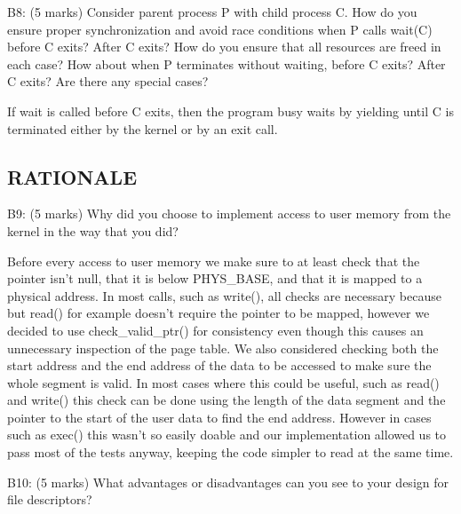 \noindent B8: (5 marks)
Consider parent process P with child process C.  How do you
ensure proper synchronization and avoid race conditions when P
calls wait(C) before C exits?  After C exits?  How do you ensure
that all resources are freed in each case?  How about when P
terminates without waiting, before C exits?  After C exits?  Are
there any special cases?


If wait is called before C exits, then the program busy waits by yielding until C is terminated either by the kernel or by an exit call.



\subsection*{RATIONALE}

\noindent B9: (5 marks)
Why did you choose to implement access to user memory from the
kernel in the way that you did?


Before every access to user memory we make sure to at least check that the pointer isn't null, that it is below PHYS\_BASE, and  that it is mapped to a physical address.
In most calls, such as write(), all checks are necessary because
but read() for example doesn't require the pointer to be mapped, however we decided to use check\_valid\_ptr() for consistency even though this causes an unnecessary inspection of the page table.
We also considered checking both the start address and the end address of the data to be accessed to make sure the whole segment is valid.
In most cases where this could be useful, such as read() and write() this check can be done using the length of the data segment and the pointer to the start of the user data to find the end address. However in cases such as exec() this wasn't so easily doable and our implementation allowed us to pass most of the tests anyway, keeping the code simpler to read at the same time. 



\noindent B10: (5 marks)
What advantages or disadvantages can you see to your design
for file descriptors?

